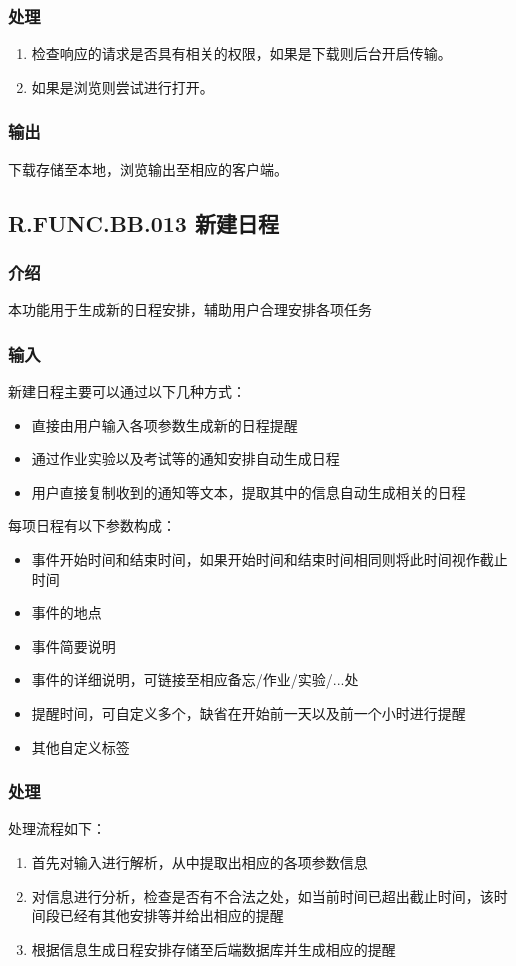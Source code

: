     \subsubsection{处理}
    \begin{enumerate}
      \item 检查响应的请求是否具有相关的权限，如果是下载则后台开启传输。
      \item 如果是浏览则尝试进行打开。
    \end{enumerate}
    \subsubsection{输出}
    下载存储至本地，浏览输出至相应的客户端。

  \subsection{R.FUNC.BB.013 新建日程}
    \subsubsection{介绍}
    本功能用于生成新的日程安排，辅助用户合理安排各项任务
    \subsubsection{输入}
    新建日程主要可以通过以下几种方式：
    \begin{itemize}
      \item 直接由用户输入各项参数生成新的日程提醒
      \item 通过作业实验以及考试等的通知安排自动生成日程
      \item 用户直接复制收到的通知等文本，提取其中的信息自动生成相关的日程
    \end{itemize}
    每项日程有以下参数构成：
    \begin{itemize}
      \item 事件开始时间和结束时间，如果开始时间和结束时间相同则将此时间视作截止时间
      \item 事件的地点
      \item 事件简要说明
      \item 事件的详细说明，可链接至相应备忘/作业/实验/...处
      \item 提醒时间，可自定义多个，缺省在开始前一天以及前一个小时进行提醒
      \item 其他自定义标签
    \end{itemize}
    \subsubsection{处理}
    处理流程如下：
    \begin{enumerate}
      \item 首先对输入进行解析，从中提取出相应的各项参数信息
      \item 对信息进行分析，检查是否有不合法之处，如当前时间已超出截止时间，该时间段已经有其他安排等并给出相应的提醒
      \item 根据信息生成日程安排存储至后端数据库并生成相应的提醒
    \end{enumerate}
